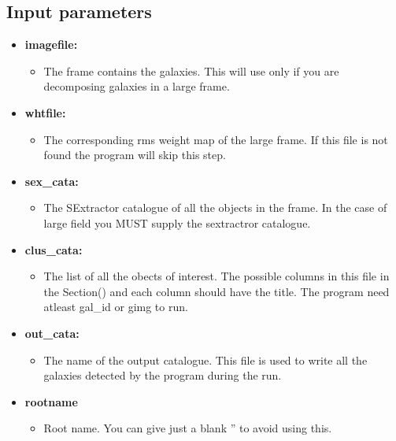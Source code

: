 \documentclass[a4paper,12pt]{article}
\begin{document}
\subsection{Input parameters}
\begin{itemize}
\item \textbf{imagefile:}
\begin{itemize}
\item[] The frame contains the galaxies. This will use only if you are decomposing galaxies in a large frame.
\end{itemize}

\item \textbf{whtfile:}
\begin{itemize}
\item[] The corresponding rms weight map of the large frame. If this file is not found the program will skip this step.
\end{itemize}

\item \textbf{sex\_cata:}
\begin{itemize}
\item[] The SExtractor catalogue of all the objects in the frame. In the case of large field you MUST supply the sextractror catalogue.
\end{itemize}

\item \textbf{clus\_cata:}
\begin{itemize}
\item[] The list of all the obects of interest. The possible columns in this file in the Section() and each column should have the title. The program need atleast gal\_id or gimg to run.
\end{itemize}

\item \textbf{out\_cata:}
\begin{itemize}
\item[] The name of the output catalogue. This file is used to write all the galaxies detected by the program during the run.
\end{itemize}

\item \textbf{rootname}
\begin{itemize}
\item[] Root name. You can give just a blank '' to avoid using this.
\end{itemize}


\end{itemize}
\end{document}
